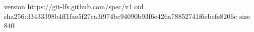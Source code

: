 version https://git-lfs.github.com/spec/v1
oid sha256:d3433398b4ff1fae5f27ca3f974bc94090b93f6e426a78852741f6ebefe8206c
size 840
